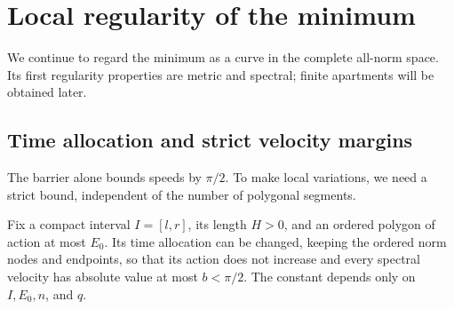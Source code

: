 \section{Local regularity of the minimum}\label{sec:localregularity}

We continue to regard the minimum as a curve in the complete all-norm
space. Its first regularity properties are metric and spectral; finite
apartments will be obtained later.

\subsection{Time allocation and strict velocity margins}
The barrier alone bounds speeds by $\pi/2$. To make local variations,
we need a strict bound, independent of the number of polygonal segments.

\begin{lemma}\label{lem:timeallocation}
Fix a compact interval $I=[l,r]$, its length $H>0$, and an ordered
polygon of action at most $E_0$. Its time allocation can be changed,
keeping the ordered norm nodes and endpoints, so that its action does
not increase and every spectral velocity has absolute value at most
$b<\pi/2$. The constant depends only on $I,E_0,n$, and $q$.
\end{lemma}

